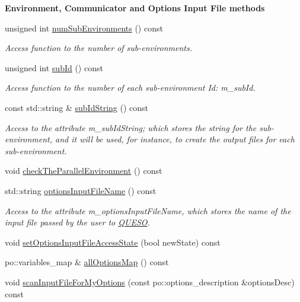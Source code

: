 \begin{Indent}{\bf Environment, Communicator and Options Input File methods}
\begin{DoxyCompactItemize}
unsigned int \hyperlink{class_q_u_e_s_o_1_1_base_environment_ac0345f57e31ef7833e379ed972bd094d}{num\-Sub\-Environments} () const 
\begin{DoxyCompactList}\small\item\em Access function to the number of sub-\/environments. \end{DoxyCompactList}\item 
unsigned int \hyperlink{class_q_u_e_s_o_1_1_base_environment_a6ae3174897a9b3a4c85fa18da5d4c16f}{sub\-Id} () const 
\begin{DoxyCompactList}\small\item\em Access function to the number of each sub-\/environment Id\-: m\-\_\-sub\-Id. \end{DoxyCompactList}\item 
const std\-::string \& \hyperlink{class_q_u_e_s_o_1_1_base_environment_a73f7849acdd5d5ba15a3094fe18f258f}{sub\-Id\-String} () const 
\begin{DoxyCompactList}\small\item\em Access to the attribute m\-\_\-sub\-Id\-String; which stores the string for the sub-\/environment, and it will be used, for instance, to create the output files for each sub-\/environment. \end{DoxyCompactList}\item 
void \hyperlink{class_q_u_e_s_o_1_1_base_environment_abc9978b83f01e6bf570e5ed283728094}{check\-The\-Parallel\-Environment} () const 
\item 
std\-::string \hyperlink{class_q_u_e_s_o_1_1_base_environment_aa0e3ccfe00e6f51dbe6dd6b9b6f65183}{options\-Input\-File\-Name} () const 
\begin{DoxyCompactList}\small\item\em Access to the attribute m\-\_\-options\-Input\-File\-Name, which stores the name of the input file passed by the user to \hyperlink{namespace_q_u_e_s_o}{Q\-U\-E\-S\-O}. \end{DoxyCompactList}\item 
void \hyperlink{class_q_u_e_s_o_1_1_base_environment_a7f1b585899bdf7ae4f6f41d2bb93f1e6}{set\-Options\-Input\-File\-Access\-State} (bool new\-State) const 
\item 
po\-::variables\-\_\-map \& \hyperlink{class_q_u_e_s_o_1_1_base_environment_ae7cee155956e0e70112f45e2ad1f02c8}{all\-Options\-Map} () const 
\item 
void \hyperlink{class_q_u_e_s_o_1_1_base_environment_ae3e118fc38e17537107b347d6b421927}{scan\-Input\-File\-For\-My\-Options} (const po\-::options\-\_\-description \&options\-Desc) const 

\end{DoxyCompactItemize}
\end{Indent}
